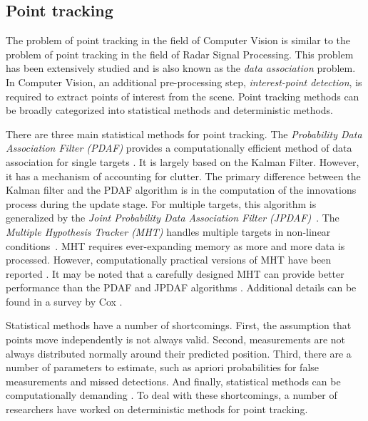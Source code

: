 \begin{Body}
\subsection{Point tracking}
The problem of point tracking in the field of Computer Vision is similar to the problem of point tracking in the field of Radar Signal Processing.  This problem has been extensively studied and is also known as the \emph{data association} problem.  In Computer Vision, an additional pre-processing step, \emph{interest-point detection}, is required to extract points of interest from the scene.  Point tracking methods can be broadly categorized into statistical methods and deterministic methods.

There are three main statistical methods for point tracking.  The \emph{Probability Data Association Filter (PDAF)} provides a computationally efficient method of data association for single targets \cite{1975_JNL_PDAF_BarShalom}.  It is largely based on the Kalman Filter.  However, it has a mechanism of accounting for clutter.  The primary difference between the Kalman filter and the PDAF algorithm is in the computation of the innovations process during the update stage.  For multiple targets, this algorithm is generalized by the \emph{Joint Probability Data Association Filter (JPDAF)}~\cite{1983_JNL_JPDAF_Fortmann}.  The \emph{Multiple Hypothesis Tracker (MHT)} handles multiple targets in non-linear conditions~\cite{1979_JNL_MTT_Reid}.  MHT requires ever-expanding memory as more and more data is processed.  However, computationally practical versions of MHT have been reported \cite{1996_JNL_EfficientMHT_Cox, 1994_CNF_MLPMHT_Streit}.  It may be noted that a carefully designed MHT can provide better performance than the PDAF and JPDAF algorithms \cite{2009_JNL_PDAF_Barshalom}.  Additional details can be found in a survey by Cox \cite{1993_JNL_SURVEYcorresp_Cox}.  

Statistical methods have a number of shortcomings.  First, the assumption that points move independently is not always valid.  Second, measurements are not always distributed normally around their predicted position.  Third, there are a number of parameters to estimate, such as apriori probabilities for false measurements and missed detections.  And finally, statistical methods can be computationally demanding \cite{2001_JNL_MotionCorrespondence_Veenman}.  To deal with these shortcomings, a number of researchers have worked on deterministic methods for point tracking.


\end{Body}
